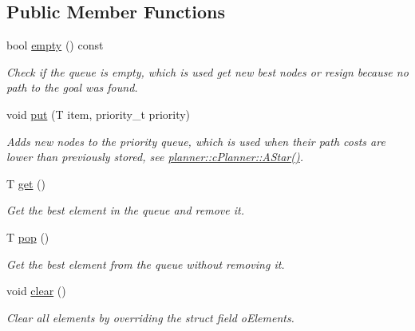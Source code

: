 \subsection*{Public Member Functions}
\begin{DoxyCompactItemize}
\item 
\mbox{\label{structplanner_1_1_priority_queue_a459a18939cb4b02517d5a7db19fd829c}} 
bool \mbox{\hyperlink{structplanner_1_1_priority_queue_a459a18939cb4b02517d5a7db19fd829c}{empty}} () const
\begin{DoxyCompactList}\small\item\em Check if the queue is empty, which is used get new best nodes or resign because no path to the goal was found. \end{DoxyCompactList}\item 
\mbox{\label{structplanner_1_1_priority_queue_afb6cb790e6a592d22a2f05441bfbf23b}} 
void \mbox{\hyperlink{structplanner_1_1_priority_queue_afb6cb790e6a592d22a2f05441bfbf23b}{put}} (T item, priority\+\_\+t priority)
\begin{DoxyCompactList}\small\item\em Adds new nodes to the priority queue, which is used when their path costs are lower than previously stored, see \mbox{\hyperlink{classplanner_1_1c_planner_a341e70531266f023ac9461d18979d1ef}{planner\+::c\+Planner\+::\+A\+Star()}}. \end{DoxyCompactList}\item 
\mbox{\label{structplanner_1_1_priority_queue_abdd3d392da157bb645b5720eace1200a}} 
T \mbox{\hyperlink{structplanner_1_1_priority_queue_abdd3d392da157bb645b5720eace1200a}{get}} ()
\begin{DoxyCompactList}\small\item\em Get the best element in the queue and remove it. \end{DoxyCompactList}\item 
\mbox{\label{structplanner_1_1_priority_queue_abba3d8fcc5729acc424b1fbc38c94e84}} 
T \mbox{\hyperlink{structplanner_1_1_priority_queue_abba3d8fcc5729acc424b1fbc38c94e84}{pop}} ()
\begin{DoxyCompactList}\small\item\em Get the best element from the queue without removing it. \end{DoxyCompactList}\item 
\mbox{\label{structplanner_1_1_priority_queue_aa98bde3a7a3256915f80e1e61572214b}} 
void \mbox{\hyperlink{structplanner_1_1_priority_queue_aa98bde3a7a3256915f80e1e61572214b}{clear}} ()
\begin{DoxyCompactList}\small\item\em Clear all elements by overriding the struct field o\+Elements. \end{DoxyCompactList}\end{DoxyCompactItemize}
